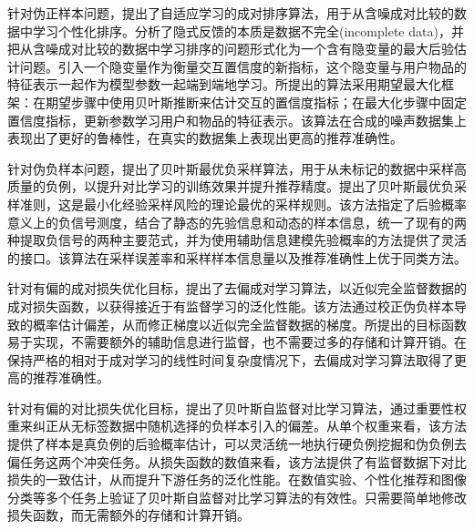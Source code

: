 针对伪正样本问题，提出了自适应学习的成对排序算法，用于从含噪成对比较的数据中学习个性化排序。分析了隐式反馈的本质是数据不完全(incomplete data)，并把从含噪成对比较的数据中学习排序的问题形式化为一个含有隐变量的最大后验估计问题。引入一个隐变量作为衡量交互置信度的新指标，这个隐变量与用户物品的特征表示一起作为模型参数一起端到端地学习。所提出的算法采用期望最大化框架：在期望步骤中使用贝叶斯推断来估计交互的置信度指标；在最大化步骤中固定置信度指标，更新参数学习用户和物品的特征表示。该算法在合成的噪声数据集上表现出了更好的鲁棒性，在真实的数据集上表现出更高的推荐准确性。

针对伪负样本问题，提出了贝叶斯最优负采样算法，用于从未标记的数据中采样高质量的负例，以提升对比学习的训练效果并提升推荐精度。提出了贝叶斯最优负采样准则，这是最小化经验采样风险的理论最优的采样规则。该方法指定了后验概率意义上的负信号测度，结合了静态的先验信息和动态的样本信息，统一了现有的两种提取负信号的两种主要范式，并为使用辅助信息建模先验概率的方法提供了灵活的接口。该算法在采样误差率和采样样本信息量以及推荐准确性上优于同类方法。

针对有偏的成对损失优化目标，提出了去偏成对学习算法，以近似完全监督数据的成对损失函数，以获得接近于有监督学习的泛化性能。该方法通过校正伪负样本导致的概率估计偏差，从而修正梯度以近似完全监督数据的梯度。所提出的目标函数易于实现，不需要额外的辅助信息进行监督，也不需要过多的存储和计算开销。在保持严格的相对于成对学习的线性时间复杂度情况下，去偏成对学习算法取得了更高的推荐准确性。

针对有偏的对比损失优化目标，提出了贝叶斯自监督对比学习算法，通过重要性权重来纠正从无标签数据中随机选择的负样本引入的偏差。从单个权重来看，该方法提供了样本是真负例的后验概率估计，可以灵活统一地执行硬负例挖掘和伪负例去偏任务这两个冲突任务。从损失函数的数值来看，该方法提供了有监督数据下对比损失的一致估计，从而提升下游任务的泛化性能。在数值实验、个性化推荐和图像分类等多个任务上验证了贝叶斯自监督对比学习算法的有效性。只需要简单地修改损失函数，而无需额外的存储和计算开销。




